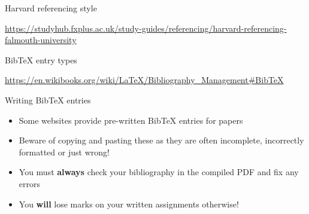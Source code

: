 \begin{frame}{Harvard referencing style}
	\begin{center}
		\small\url{https://studyhub.fxplus.ac.uk/study-guides/referencing/harvard-referencing-falmouth-university}
	\end{center}
\end{frame}

\begin{frame}{BibTeX entry types}
	\begin{center}
		\small\url{https://en.wikibooks.org/wiki/LaTeX/Bibliography_Management\#BibTeX}
	\end{center}
\end{frame}

\begin{frame}{Writing BibTeX entries}
	\begin{itemize}
		\pause\item Some websites provide pre-written BibTeX entries for papers
		\pause\item Beware of copying and pasting these as they are often incomplete, incorrectly formatted or just wrong!
		\pause\item You must \textbf{always} check your bibliography in the compiled PDF and fix any errors
		\pause\item You \textbf{will} lose marks on your written assignments otherwise!
	\end{itemize}
\end{frame}

